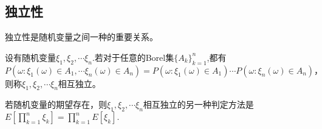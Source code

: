 \documentclass[lang=cn,10pt]{elegantbook}
\begin{document}
	\subsection{独立性}
	独立性是随机变量之间一种的重要关系。
	\begin{definition}[独立性]
		设有随机变量\(\xi_1,\xi_2,\cdots \xi_n\).若对于任意的Borel集\(\{A_k\}_{k=1}^n\),都有
		\[P(\omega:\xi_1(\omega)\in A_1,\cdots \xi_n(\omega)\in A_n)=P(\omega:\xi_1(\omega)\in A_1)\cdots P(\omega:\xi_n(\omega)\in A_n)，\]
		则称\(\xi_1,\xi_2,\cdots \xi_n\)相互独立。
	\end{definition}
	\begin{note}
		若随机变量的期望存在，则\(\xi_1,\xi_2,\cdots \xi_n\)相互独立的另一种判定方法是\(E[\prod_{k=1}^{n}\xi_k]=\prod_{k=1}^{n}E[\xi_k].\)
	\end{note}
	
\end{document}
